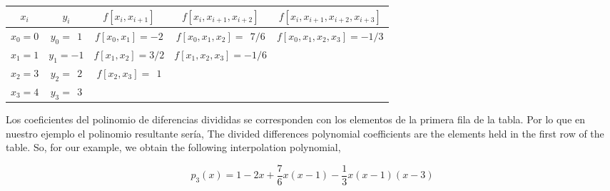 \begin{table}[h]
\centering
{}
\begin{tabular}{ccccc}
$x_i$&$y_i$&$f\left[x_i,x_{i+1}\right]$&$f\left[x_i,x_{i+1},x_{i+2}\right]$&$f\left[x_i,x_{i+1},x_{i+2},x_{i+3}\right]$\\
\hline
$x_0=0$&$y_0=\ \  1$&$f\left[x_0,x_1\right]=-2$&$f\left[x_0,x_1,x_2\right]=\ \ 7/6$&$f\left[x_0,x_1,x_2,x_3\right]=-1/3$\\
$x_1=1$&$y_1=-1$&$f\left[x_1,x_2\right]=3/2$&$f\left[x_1,x_2,x_3\right]=-1/6$\\
$x_2=3$&$y_2=\ \ 2$&$f\left[x_2,x_3\right]=\ \ 1$\\
$x_3=4$&$y_3=\ \ 3$\\

\end{tabular}
\label{tabdif}
\end{table}
\begin{paracol}{2}
Los coeficientes del polinomio de diferencias divididas se corresponden con los elementos de la primera fila de la tabla. Por lo que en nuestro ejemplo el polinomio resultante sería,
\switchcolumn
The divided differences polynomial coefficients are the elements held in the first row of the table. So, for our example, we obtain the following interpolation polynomial, 
\end{paracol}
\begin{equation*}
p_3(x)=1-2x+\frac{7}{6}x(x-1)-\frac{1}{3}x(x-1)(x-3)
\end{equation*}
